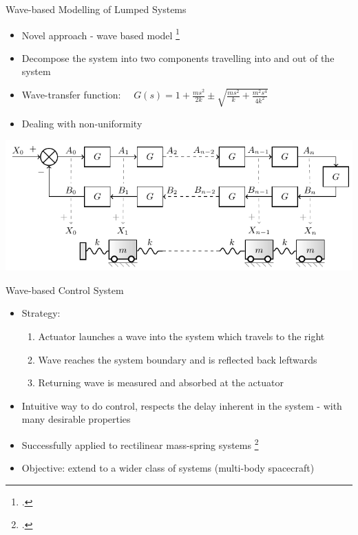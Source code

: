 \documentclass{beamer}
\begin{document}
\begin{frame}{Wave-based Modelling of Lumped Systems}
\begin{itemize}
\item Novel approach - wave based model \footcite{OConnor2011}
\item Decompose the system into two components travelling into and out of the system
\item Wave-transfer function:
$ \quad G(s) =1+ \frac{m s^2}{2k} \pm \sqrt{\frac{m s^2}{k}+\frac{m^2 s^4}{4 k^2}}$
\item Dealing with non-uniformity
\end{itemize}
\includegraphics[width=\textwidth]{images/series_model_tf_unif.pdf}
\end{frame}

\begin{frame}{Wave-based Control System}

\begin{itemize}
\item Strategy:
	\begin{enumerate} %
	\item Actuator launches a wave into the system which travels to the right 
	\item Wave reaches the system boundary and is reflected back leftwards
	\item Returning wave is measured and absorbed at the actuator
	\end{enumerate}
\item Intuitive way to do control, respects the delay inherent in the system - with many desirable properties
\item Successfully applied to rectilinear mass-spring systems \footcite{OConnor1998}
\item Objective: extend to a wider class of systems (multi-body spacecraft)
\end{itemize}
\end{frame}
\end{document}
